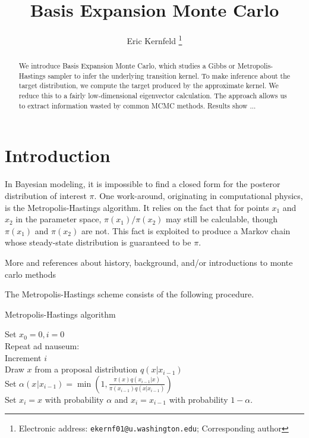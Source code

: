 \documentclass{article}
\begin{document}
\title{Basis Expansion Monte Carlo}

\author{Eric Kernfeld
  \thanks{Electronic address: \texttt{ekernf01@u.washington.edu}; Corresponding author}}
\maketitle

\begin{abstract}
We introduce Basis Expansion Monte Carlo, which studies a Gibbs or Metropolis-Hastings sampler to infer the underlying transition kernel. To make inference about the target distribution, we compute the target produced by the approximate kernel. We reduce this to a fairly low-dimensional eigenvector calculation. The approach allows us to extract information wasted by common MCMC methods. Results show ...
\end{abstract}


\section{Introduction}
In Bayesian modeling, it is impossible to find a closed form for the posteror distribution of interest $\pi$. One work-around, originating in computational physics, is the Metropolis-Hastings algorithm. It relies on the fact that for points $x_1$ and $x_2$ in the parameter space, $\pi(x_1)/\pi(x_2)$ may still be calculable, though $\pi(x_1)$ and $\pi(x_2)$ are not. This fact is exploited to produce a Markov chain whose steady-state distribution is guaranteed to be $\pi$. 

More and references about history, background, and/or introductions to monte carlo methods



The Metropolis-Hastings scheme consists of the following procedure.

\begin{algorithm}[h]
\caption{Metropolis-Hastings algorithm}
Set $x_0 = 0, i=0$\\
Repeat ad nauseum:\\
\Indp
Increment $i$\\
Draw $x$ from a proposal distribution $q(x|x_{i-1})$\\
Set $\alpha(x_{}|x_{i-1}) = \min(1, \frac{\pi(x)q(x_{i-1}|x)}{\pi(x_{i-1})q(x|x_{i-1})})$\\
Set $x_i = x$ with probability $\alpha$ and $x_i = x_{i-1}$ with probability $1 - \alpha$.\\
\end{algorithm}
\end{document}
